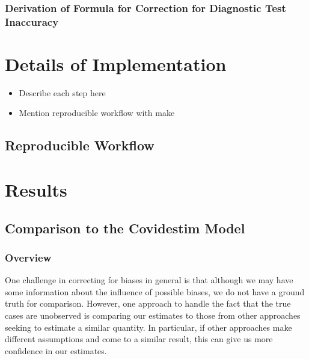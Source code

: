 \documentclass[12pt,twoside]{smiththesis}
\providecommand{\tightlist}{%
  \setlength{\itemsep}{0pt}\setlength{\parskip}{0pt}}
\begin{document}
\hypertarget{derivation-of-formula-for-correction-for-diagnostic-test-inaccuracy}{%
\subsection{Derivation of Formula for Correction for Diagnostic Test Inaccuracy}\label{derivation-of-formula-for-correction-for-diagnostic-test-inaccuracy}}

\hypertarget{details-of-implementation}{%
\chapter{Details of Implementation}\label{details-of-implementation}}
\begin{itemize}
\tightlist
\item
  Describe each step here
\item
  Mention reproducible workflow with make
\end{itemize}
\hypertarget{reproducible-workflow}{%
\section{Reproducible Workflow}\label{reproducible-workflow}}

\hypertarget{results}{%
\chapter{Results}\label{results}}

\hypertarget{comparison-to-the-covidestim-model}{%
\section{Comparison to the Covidestim Model}\label{comparison-to-the-covidestim-model}}

\hypertarget{overview-2}{%
\subsection{Overview}\label{overview-2}}

One challenge in correcting for biases in general is that although we may have some information about the influence of possible biases, we do not have a ground truth for comparison. However, one approach to handle the fact that the true cases are unobserved is comparing our estimates to those from other approaches seeking to estimate a similar quantity. In particular, if other approaches make different assumptions and come to a similar result, this can give us more confidence in our estimates.
\end{document}
